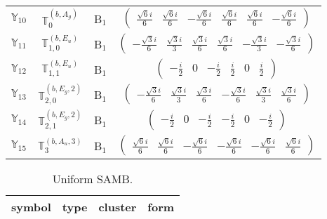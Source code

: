 \documentclass[fleqn,10pt,landscape]{article}
\begin{document}
\begin{itemize}
\begin{center}
\begin{longtable}{c|c|c|c}
$ \mathbb{Y}_{10} $ & $\mathbb{T}_{0}^{(b,A_{g})}$ & B$_{1}$ & $\begin{pmatrix} \frac{\sqrt{6} i}{6} & \frac{\sqrt{6} i}{6} & - \frac{\sqrt{6} i}{6} & \frac{\sqrt{6} i}{6} & \frac{\sqrt{6} i}{6} & - \frac{\sqrt{6} i}{6} \end{pmatrix}$ \\
$ \mathbb{Y}_{11} $ & $\mathbb{T}_{1,0}^{(b,E_{u})}$ & B$_{1}$ & $\begin{pmatrix} - \frac{\sqrt{3} i}{6} & \frac{\sqrt{3} i}{3} & \frac{\sqrt{3} i}{6} & \frac{\sqrt{3} i}{6} & - \frac{\sqrt{3} i}{3} & - \frac{\sqrt{3} i}{6} \end{pmatrix}$ \\
$ \mathbb{Y}_{12} $ & $\mathbb{T}_{1,1}^{(b,E_{u})}$ & B$_{1}$ & $\begin{pmatrix} - \frac{i}{2} & 0 & - \frac{i}{2} & \frac{i}{2} & 0 & \frac{i}{2} \end{pmatrix}$ \\
$ \mathbb{Y}_{13} $ & $\mathbb{T}_{2,0}^{(b,E_{g},2)}$ & B$_{1}$ & $\begin{pmatrix} - \frac{\sqrt{3} i}{6} & \frac{\sqrt{3} i}{3} & \frac{\sqrt{3} i}{6} & - \frac{\sqrt{3} i}{6} & \frac{\sqrt{3} i}{3} & \frac{\sqrt{3} i}{6} \end{pmatrix}$ \\
$ \mathbb{Y}_{14} $ & $\mathbb{T}_{2,1}^{(b,E_{g},2)}$ & B$_{1}$ & $\begin{pmatrix} - \frac{i}{2} & 0 & - \frac{i}{2} & - \frac{i}{2} & 0 & - \frac{i}{2} \end{pmatrix}$ \\
$ \mathbb{Y}_{15} $ & $\mathbb{T}_{3}^{(b,A_{u},3)}$ & B$_{1}$ & $\begin{pmatrix} \frac{\sqrt{6} i}{6} & \frac{\sqrt{6} i}{6} & - \frac{\sqrt{6} i}{6} & - \frac{\sqrt{6} i}{6} & - \frac{\sqrt{6} i}{6} & \frac{\sqrt{6} i}{6} \end{pmatrix}$ \\
\end{longtable}
\end{center}
\begin{center}
\renewcommand{\arraystretch}{1.3}
\begin{longtable}{c|c|c|c}
\caption{Uniform SAMB.}
 \\
 \hline \hline
symbol & type & cluster & form \\ \hline \endfirsthead


\end{longtable}
\end{center}
\end{itemize}
\end{document}
